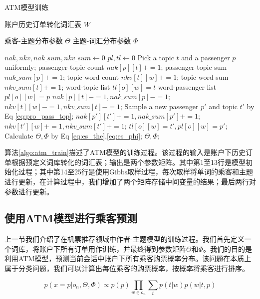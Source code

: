 \begin{algorithm}
\caption{ATM模型训练}
\label{algo:atm_train}
\begin{algorithmic}[1]
\Require
\Statex 账户历史订单转化词汇表 $W$

\Ensure 
\Statex 乘客-主题分布参数 $\Theta$
\Statex 主题-词汇分布参数 $\Phi$

\State $nak , nkv, nak\_sum, nkv\_sum \gets 0$
\State $pl , tl \gets 0$
\State Pick a topic $t$ and a passenger $p$ uniformly;
\State passenger-topic count $nak[p][t] += 1$;
\State passenger-topic sum $nak\_sum[p] += 1$;
\State topic-word count $nkv[t][w] += 1$;
\State topic-word sum $nkv\_sum[t] += 1$;
\State word-topic list $tl[o][w] = t$
\State word-passenger list $pl[o][w] = p$
\EndFor
\EndFor
{}
\State $nak[p][t] -= 1, nak\_sum[p] -= 1$;
\State $nkv[t][w] -= 1, nkv\_sum[t] -= 1$;
\State Sample a new passenger $p'$ and topic $t'$ by Eq \ref{eq:pro_pass_top};
\State $nak[p'][t'] += 1, nak\_sum[p'] += 1$;
\State $nkv[t'][w] += 1, nkv\_sum[t'] += 1$;
\State $tl[o][w] = t', pl[o][w] = p'$;
\EndFor
\EndFor
\EndWhile
\State Calculate $\Theta,\Phi$ by Eq \ref{eq:es_the},\ref{eq:es_phi};
\State \Return $\Theta,\Phi$;
\end{algorithmic} 
\end{algorithm}

算法\ref{algo:atm_train}描述了ATM模型的训练过程。该过程的输入是账户下历史订单根据预定义词库转化的词汇表；输出是两个参数矩阵。其中第1至13行是模型初始化过程；其中第14至25行是使用Gibbs取样过程，每次取样将单词的乘客和主题进行更新，在计算过程中，我们增加了两个矩阵存储中间变量的结果；最后两行对参数进行更新。

\subsection{使用ATM模型进行乘客预测}

上一节我们介绍了在机票推荐领域中作者-主题模型的训练过程。我们首先定义一个词库，将账户下所有订单用作训练，并最终得到参数矩阵$\Theta$和$\Phi$。我们的目的是利用ATM模型，预测当前会话中账户下所有乘客购票概率分布。该问题在本质上属于分类问题，我们可以计算出每位乘客的购票概率，按概率将乘客进行排序。

\begin{equation}
\label{eq:pred_pass}
p(x=p|o_n,\Theta,\Phi) \propto p(p)\prod_{w \in o_n}\sum_t p(t|w)p(w|t,p)
\end{equation}

